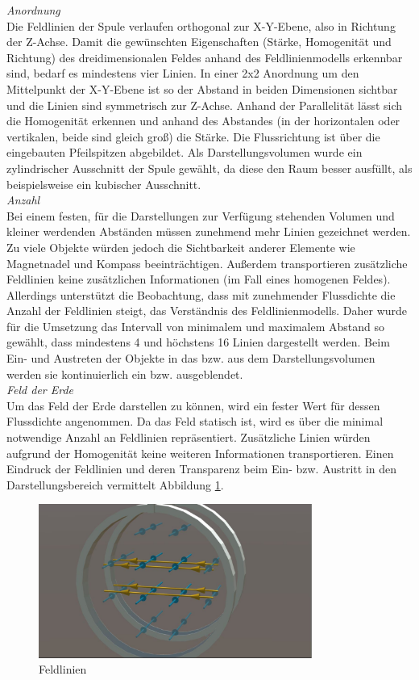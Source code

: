 \textit{Anordnung}\\
Die Feldlinien der Spule verlaufen orthogonal zur X-Y-Ebene, also in Richtung der Z-Achse. Damit die gewünschten Eigenschaften (Stärke, Homogenität und Richtung) des dreidimensionalen Feldes anhand des Feldlinienmodells erkennbar sind, bedarf es mindestens vier Linien. In einer 2x2 Anordnung um den Mittelpunkt der X-Y-Ebene ist so der Abstand in beiden Dimensionen sichtbar und die Linien sind symmetrisch zur Z-Achse. Anhand der Parallelität lässt sich die Homogenität erkennen und anhand des Abstandes (in der horizontalen oder vertikalen, beide sind gleich groß) die Stärke. Die Flussrichtung ist über die eingebauten Pfeilspitzen abgebildet. Als Darstellungsvolumen wurde ein zylindrischer Ausschnitt der Spule gewählt, da diese den Raum besser ausfüllt, als beispielsweise ein kubischer Ausschnitt.\\

\textit{Anzahl}\\
Bei einem festen, für die Darstellungen zur Verfügung stehenden Volumen und kleiner werdenden Abständen müssen zunehmend mehr Linien gezeichnet werden. Zu viele Objekte würden jedoch die Sichtbarkeit anderer Elemente wie Magnetnadel und Kompass beeinträchtigen. Außerdem transportieren zusätzliche Feldlinien keine zusätzlichen Informationen (im Fall eines homogenen Feldes). Allerdings unterstützt die Beobachtung, dass mit zunehmender Flussdichte die Anzahl der Feldlinien steigt, das Verständnis des Feldlinienmodells. Daher wurde für die Umsetzung das Intervall von minimalem und maximalem Abstand so gewählt, dass mindestens 4 und höchstens 16 Linien dargestellt werden. Beim Ein- und Austreten der Objekte in das bzw. aus dem Darstellungsvolumen werden sie kontinuierlich ein bzw. ausgeblendet.\\

\textit{Feld der Erde}\\
Um das Feld der Erde darstellen zu können, wird ein fester Wert für dessen Flussdichte angenommen. Da das Feld statisch ist, wird es über die minimal notwendige Anzahl an Feldlinien repräsentiert. Zusätzliche Linien würden aufgrund der Homogenität keine weiteren Informationen transportieren. Einen Eindruck der Feldlinien und deren Transparenz beim Ein- bzw. Austritt in den Darstellungsbereich vermittelt Abbildung \ref{img:mfield-lines}.

\begin{figure}[h!]
	\centering
	\includegraphics[width=0.8\textwidth]{images/unity/fieldlines.jpg}
	\caption{Feldlinien}
	\label{img:mfield-lines}
\end{figure}

